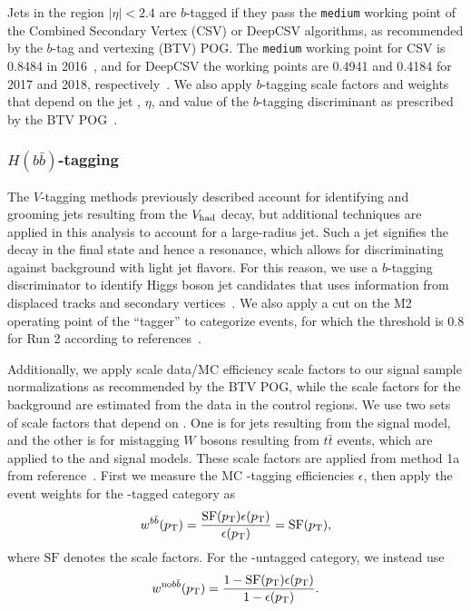 Jets in the region $|\eta|<2.4$ are $b$-tagged if they pass the \texttt{medium} working point of the Combined Secondary Vertex (CSV) or DeepCSV algorithms, as recommended by the $b$-tag and vertexing (BTV) POG.
The \texttt{medium} working point for CSV is 0.8484 in 2016~\cite{bTagging2016}, and for DeepCSV the working points are 0.4941 and 0.4184 for 2017 and 2018, respectively~\cite{bTagging2017,bTagging2018}.
We also apply $b$-tagging scale factors and weights that depend on the jet \pt, $\eta$, and value of the $b$-tagging discriminant as prescribed by the BTV POG~\cite{bTaggingEff,bTaggingSF}.

\subsubsection{$H(b\bar{b})$-tagging}

The $V$-tagging methods previously described account for identifying and grooming jets resulting from the $V_\mathrm{had}$ decay, but additional techniques are applied in this analysis to account for a large-radius \bbbar jet.
Such a jet signifies the decay \Htobbbar in the final state and hence a \WH resonance, which allows for discriminating against background with light jet flavors.
For this reason, we use a $b$-tagging discriminator to identify Higgs boson jet candidates that uses information from displaced tracks and secondary vertices~\cite{CMS-PAS-BTV-15-002}.
We also apply a cut on the M2 operating point of the ``\DoubleB tagger'' to categorize events, for which the threshold is 0.8 for Run 2 according to references~\cite{bTagging2016,bTagging2017,bTagging2018}.

Additionally, we apply scale data/MC efficiency scale factors to our signal sample normalizations as recommended by the BTV POG, while the scale factors for the background are estimated from the data in the control regions.
We use two sets of scale factors that depend on \ptjet.
One is for \Htobbbar jets resulting from the \WprtoWHtolnubbbar signal model, and the other is for mistagging $W$ bosons resulting from $t\bar{t}$ events, which are applied to the \GBulktoWWtolnuqqbarpr and \WprtoWZtolnuqqbar signal models.
These scale factors are applied from method 1a from reference~\cite{bTaggingEff}.
First we measure the MC \bbbar-tagging efficiencies $\epsilon$, then apply the event weights for the \bbbar-tagged category as
\begin{equation}
  w^{b\bar{b}}(p_\mathrm{T})=\frac{\mathrm{SF}(p_\mathrm{T})\epsilon(p_\mathrm{T})}{\epsilon(p_\mathrm{T})}=\mathrm{SF}(p_\mathrm{T}),
\end{equation}
where $\mathrm{SF}$ denotes the scale factors.
For the \bbbar-untagged category, we instead use
\begin{equation}
  w^{\mathrm{no}b\bar{b}}(p_\mathrm{T})=\frac{1-\mathrm{SF}(p_\mathrm{T})\epsilon(p_\mathrm{T})}{1-\epsilon(p_\mathrm{T})}.
\end{equation}

